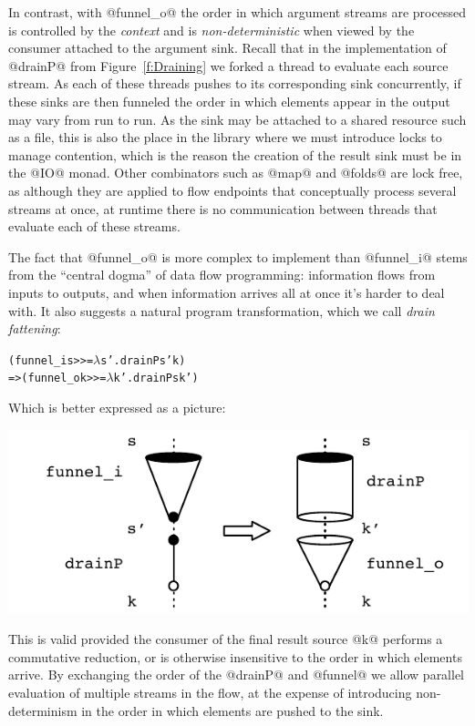 In contrast, with @funnel_o@ the order in which argument streams are processed is controlled by the \emph{context} and is \emph{non-deterministic} when viewed by the consumer attached to the argument sink. Recall that in the implementation of @drainP@ from Figure~\ref{f:Draining} we forked a thread to evaluate each source stream. As each of these threads pushes to its corresponding sink concurrently, if these sinks are then funneled the order in which elements appear in the output may vary from run to run. As the sink may be attached to a shared resource such as a file, this is also the place in the library where we must introduce locks to manage contention, which is the reason the creation of the result sink must be in the @IO@ monad. Other combinators such as @map@ and @folds@ are lock free, as although they are applied to flow endpoints that conceptually process several streams at once, at runtime there is no communication between threads that evaluate each of these streams.

The fact that @funnel_o@ is more complex to implement than @funnel_i@ stems from the ``central dogma'' of data flow programming: information flows from inputs to outputs, and when information arrives all at once it's harder to deal with. It also suggests a natural program transformation, which we call \emph{drain fattening}:
\begin{alltt}
        (funnel_i s >>= \(\lambda\)s'. drainP s' k)
     => (funnel_o k >>= \(\lambda\)k'. drainP s  k')
\end{alltt}

Which is better expressed as a picture:
\begin{center}
\includegraphics[scale=0.8]{figures/drain-fatten.pdf}
\end{center}

This is valid provided the consumer of the final result source @k@ performs a commutative reduction, or is otherwise insensitive to the order in which elements arrive. By exchanging the order of the @drainP@ and @funnel@ we allow parallel evaluation of multiple streams in the flow, at the expense of introducing non-determinism in the order in which elements are pushed to the sink.

